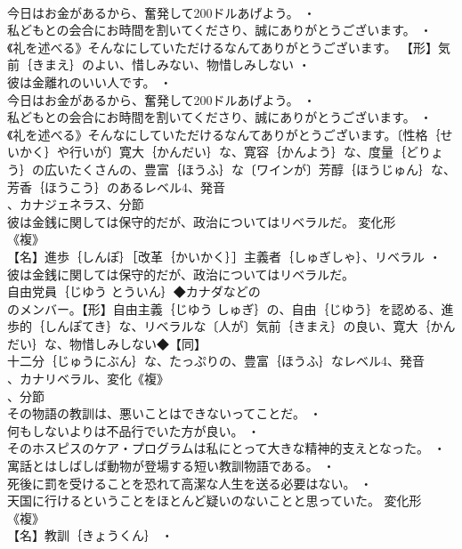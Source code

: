 \documentclass[8pt]{extreport}
\begin{document}
\begin{CJK}{UTF8}{min}
\\	今日はお金があるから、奮発して200ドルあげよう。 ・
\\	私どもとの会合にお時間を割いてくださり、誠にありがとうございます。 ・
\\	《礼を述べる》そんなにしていただけるなんてありがとうございます。		【形】気前｛きまえ｝のよい、惜しみない、物惜しみしない ・
\\	彼は金離れのいい人です。 ・
\\	今日はお金があるから、奮発して200ドルあげよう。 ・
\\	私どもとの会合にお時間を割いてくださり、誠にありがとうございます。 ・
\\	《礼を述べる》そんなにしていただけるなんてありがとうございます。〔性格｛せいかく｝や行いが〕寛大｛かんだい｝な、寛容｛かんよう｝な、度量｛どりょう｝の広いたくさんの、豊富｛ほうふ｝な〔ワインが〕芳醇｛ほうじゅん｝な、芳香｛ほうこう｝のあるレベル4、発音
\\	、カナジェネラス、分節
\\	彼は金銭に関しては保守的だが、政治についてはリベラルだ。	変化形 
\\	《複》
\\	【名】進歩｛しんぽ｝［改革｛かいかく｝］主義者｛しゅぎしゃ｝、リベラル ・
\\	彼は金銭に関しては保守的だが、政治についてはリベラルだ。
\\	自由党員｛じゆう とういん｝◆カナダなどの
\\	のメンバー。【形】自由主義｛じゆう しゅぎ｝の、自由｛じゆう｝を認める、進歩的｛しんぽてき｝な、リベラルな〔人が〕気前｛きまえ｝の良い、寛大｛かんだい｝な、物惜しみしない◆【同】
\\	十二分｛じゅうにぶん｝な、たっぷりの、豊富｛ほうふ｝なレベル4、発音
\\	、カナリベラル、変化《複》
\\	、分節
\\	その物語の教訓は、悪いことはできないってことだ。 ・
\\	何もしないよりは不品行でいた方が良い。 ・
\\	そのホスピスのケア・プログラムは私にとって大きな精神的支えとなった。 ・
\\	寓話とはしばしば動物が登場する短い教訓物語である。 ・
\\	死後に罰を受けることを恐れて高潔な人生を送る必要はない。 ・
\\	天国に行けるということをほとんど疑いのないことと思っていた。	変化形 
\\	《複》
\\	【名】教訓｛きょうくん｝ ・

\end{CJK}
\end{document}
